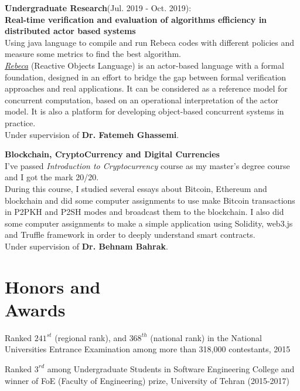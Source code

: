 \documentclass[line, mm]{sampleCV}
\begin{document}
\begin{resume}
\begin{list2}
	
	\item \textbf{َUndergraduate Research}(Jul. 2019 - Oct. 2019): \\
	\textbf{Real-time verification and evaluation of algorithms efficiency in distributed actor based systems}\\
	Using java language to compile and run Rebeca codes with different policies and measure some metrics to find the best algorithm.\\
	\href{http://rebeca-lang.org/}{\textit{Rebeca}} (Reactive Objects Language) is an actor-based language with a formal foundation, designed in an effort to bridge the gap between formal verification approaches and real applications. It can be considered as a reference model for concurrent computation, based on an operational interpretation of the actor model. It is also a platform for developing object-based concurrent systems in practice.\\
	Under supervision of \textbf{Dr. Fatemeh Ghassemi}.
	\\
	\item \textbf{Blockchain, CryptoCurrency and Digital Currencies}	\\
	I've passed \textit{Introduction to Cryptocurrency} course as my master's degree course and I got the mark 20/20. \\ 
	During this course, I studied several essays about Bitcoin, Ethereum and blockchain and did some computer assignments to use make Bitcoin transactions in P2PKH and P2SH modes and broadcast them to the blockchain.
	I also did some computer assignments to make a simple application using Solidity,  web3.js and Truffle framework in order to deeply understand smart contracts.\\
	Under supervision of \textbf{Dr. Behnam Bahrak}.
\end{list2}



\section{\mysidestyle Honors and\\Awards} 
\begin{list2}
\item Ranked $241^{st}$ (regional rank), and $368^{th}$ (national rank) in the National Universities Entrance Examination among more than 318,000 contestants, 2015
\item Ranked $3^{rd}$ among Undergraduate Students in Software Engineering College and winner of FoE (Faculty of Engineering) prize, University of Tehran (2015-2017)
\end{list2}



\end{resume}
\end{document}
